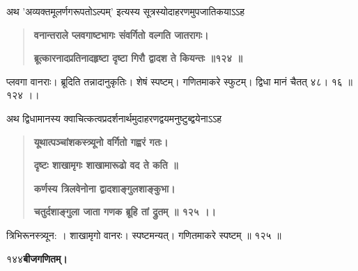 \documentclass[11pt, openany]{book}
\begin{document}
\begin{sloppypar}
\hangindent=0.2in \hspace{0.2in}अथ 'अव्यक्तमूलर्णगरूपतोऽल्पम्' इत्यस्य सूत्रस्योदाहरणमुपजातिकयाऽऽह\textendash

\begin{quote}
\hspace{1in}\textbf{वनान्तराले प्लवगाष्टभागः संवर्गितो वल्गति जातरागः।}

\hspace{1in}\textbf{ब्रूत्कारनादप्रतिनादहृष्टा दृष्टा गिरौ द्वादश ते कियन्तः ॥१२४ ॥}
\end{quote}

\hangindent=0.2in \hspace{0.2in}प्लवगा वानराः। ब्रूदिति तन्नादानुकृतिः। शेषं स्पष्टम्। गणितमाकरे स्फुटम्। द्विधा मानं चैतत् ४८। १६ ॥ १२४ ।।

\hangindent=0.2in \hspace{0.2in}अथ द्विधामानस्य क्वाचित्कत्वप्रदर्शनार्थमुदाहरणद्वयमनुष्टुब्द्वयेनाऽऽह \textendash

\begin{quote}
\hspace{1in}\textbf{यूथात्पञ्चांशकस्त्र्यूनो वर्गितो गह्वरं गतः।}

\hspace{1in}\textbf{दृष्टः शाखामृगः शाखामारूढो वद ते कति ॥}

\hspace{1in}\textbf{कर्णस्य त्रिलवेनोना द्वादशाङ्गुलशाङ्कुभा।}

\hspace{1in}\textbf{चतुर्दशाङ्गुला जाता गणक ब्रूहि तां द्रुतम् ॥ १२५ ।।}
\end{quote}

\hangindent=0.2in \hspace{0.2in}त्रिभिरूनस्त्र्यून: । शाखामृगो वानरः। स्पष्टमन्यत्। गणितमाकरे स्पष्टम्
॥ १२५ ॥
\end{sloppypar}
\thispagestyle{empty}
\newpage

\onehalfspacing
१४४\hspace{2in}\textbf{बीजगणितम्।} 

\vspace{5mm}
\end{document}
